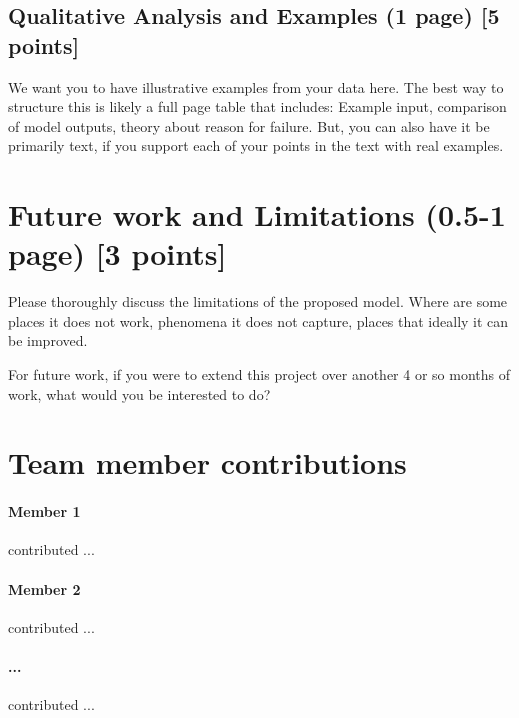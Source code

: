 \documentclass[11pt,a4paper]{article}
\begin{document}
\clearpage
\subsection{Qualitative Analysis and Examples (1 page) [5 points]}
We want you to have illustrative examples from your data here. The best way to structure this is likely a full page table that includes: Example input, comparison of model outputs, theory about reason for failure. But, you can also have it be primarily text, if you support each of your points in the text with real examples.

\clearpage
\section{Future work and Limitations (0.5-1 page) [3 points]}
Please thoroughly discuss the limitations of the proposed model.  Where are some places it does not work, phenomena it does not capture, places that ideally it can be improved.

For future work, if you were to extend this project over another 4 or so months of work, what would you be interested to do?

\clearpage
\section{Team member contributions}
\paragraph{Member 1} contributed ...

\paragraph{Member 2} contributed ...

\paragraph{...} contributed ...





\end{document}
